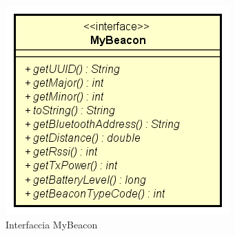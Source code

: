 \documentclass[../DefinizioneDiProdotto.tex]{subfiles}
\begin{document}
    \begin{figure}[H]
        \centering
        \includegraphics{img/MyBeacon.png}
        \caption{Interfaccia MyBeacon}\label{fig:model::beacon::MyBeacon} 
    \end{figure}
\end{document}
